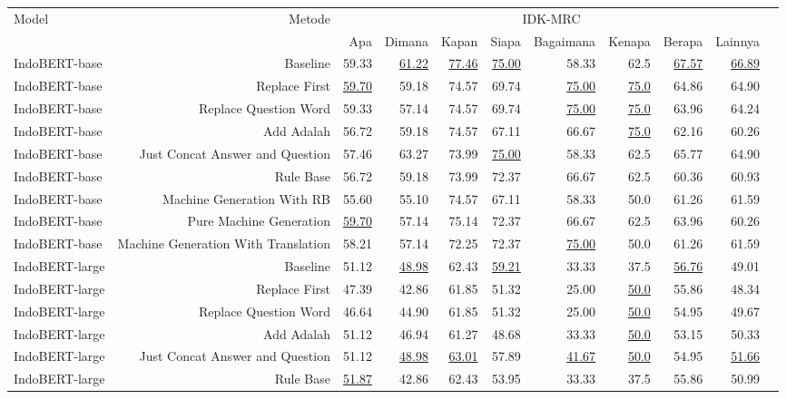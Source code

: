 \begin{table}[H]\centering
\tiny
\begin{tabular}{lrrrrrrrrrr}\toprule
\multirow{2}{*}{Model} &\multirow{2}{*}{Metode} &\multicolumn{8}{c}{IDK-MRC} \\\cmidrule{3-10}
& &Apa &Dimana &Kapan &Siapa &Bagaimana &Kenapa &Berapa &Lainnya \\\midrule
IndoBERT-base &Baseline &59.33 &\underline{61.22} &\underline{77.46} &\underline{75.00} &58.33 &62.5 &\underline{67.57} &\underline{66.89} \\
IndoBERT-base &Replace First &\underline{59.70} &59.18 &74.57 &69.74 &\underline{75.00} &\underline{75.0} &64.86 &64.90 \\
IndoBERT-base &Replace Question Word &59.33 &57.14 &74.57 &69.74 &\underline{75.00} &\underline{75.0} &63.96 &64.24 \\
IndoBERT-base &Add Adalah &56.72 &59.18 &74.57 &67.11 &66.67 &\underline{75.0} &62.16 &60.26 \\
IndoBERT-base &Just Concat Answer and Question &57.46 &63.27 &73.99 &\underline{75.00} &58.33 &62.5 &65.77 &64.90 \\
IndoBERT-base &Rule Base &56.72 &59.18 &73.99 &72.37 &66.67 &62.5 &60.36 &60.93 \\
IndoBERT-base &Machine Generation With RB &55.60 &55.10 &74.57 &67.11 &58.33 &50.0 &61.26 &61.59 \\
IndoBERT-base &Pure Machine Generation &\underline{59.70} &57.14 &75.14 &72.37 &66.67 &62.5 &63.96 &60.26 \\
IndoBERT-base &Machine Generation With Translation &58.21 &57.14 &72.25 &72.37 &\underline{75.00} &50.0 &61.26 &61.59 \\
\hline
IndoBERT-large &Baseline &51.12 &\underline{48.98} &62.43 &\underline{59.21} &33.33 &37.5 &\underline{56.76} &49.01 \\
IndoBERT-large &Replace First &47.39 &42.86 &61.85 &51.32 &25.00 &\underline{50.0} &55.86 &48.34 \\
IndoBERT-large &Replace Question Word &46.64 &44.90 &61.85 &51.32 &25.00 &\underline{50.0} &54.95 &49.67 \\
IndoBERT-large &Add Adalah &51.12 &46.94 &61.27 &48.68 &33.33 &\underline{50.0} &53.15 &50.33 \\
IndoBERT-large &Just Concat Answer and Question &51.12 &\underline{48.98} &\underline{63.01} &57.89 &\underline{41.67} &\underline{50.0} &54.95 &\underline{51.66} \\
IndoBERT-large &Rule Base &\underline{51.87} &42.86 &62.43 &53.95 &33.33 &37.5 &55.86 &50.99 \\

\end{tabular}
\end{table}
